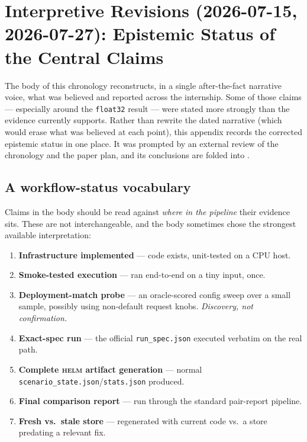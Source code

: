 \documentclass[11pt]{report}
\newcommand{\code}[1]{\texttt{#1}}
\newcommand{\file}[1]{\texttt{#1}}
\begin{document}
\chapter{Interpretive Revisions (2026-07-15, 2026-07-27): Epistemic Status of the Central Claims}
\label{app:revision}

The body of this chronology reconstructs, in a single after-the-fact narrative
voice, what was believed and reported across the internship. Some of those claims
--- especially around the \code{float32} result --- were stated more strongly than
the evidence currently supports. Rather than rewrite the dated narrative (which
would erase what was believed at each point), this appendix records the corrected
epistemic status in one place. It was prompted by an external review of the
chronology and the paper plan, and its conclusions are folded into
.

\section{A workflow-status vocabulary}

Claims in the body should be read against \emph{where in the pipeline} their
evidence sits. These are not interchangeable, and the body sometimes chose the
strongest available interpretation:

\begin{enumerate}[nosep]
  \item \textbf{Infrastructure implemented} --- code exists, unit-tested on a CPU host.
  \item \textbf{Smoke-tested execution} --- ran end-to-end on a tiny input, once.
  \item \textbf{Deployment-match probe} --- an oracle-scored config sweep over a small
        sample, possibly using non-default request knobs. \emph{Discovery, not
        confirmation.}
  \item \textbf{Exact-spec run} --- the official \file{run\_spec.json} executed
        verbatim on the real path.
  \item \textbf{Complete \textsc{helm} artifact generation} --- normal
        \file{scenario\_state.json}/\file{stats.json} produced.
  \item \textbf{Final comparison report} --- run through the standard pair-report
        pipeline.
  \item \textbf{Fresh vs.\ stale store} --- regenerated with current code vs.\ a store
        predating a relevant fix.
\end{enumerate}
\end{document}
